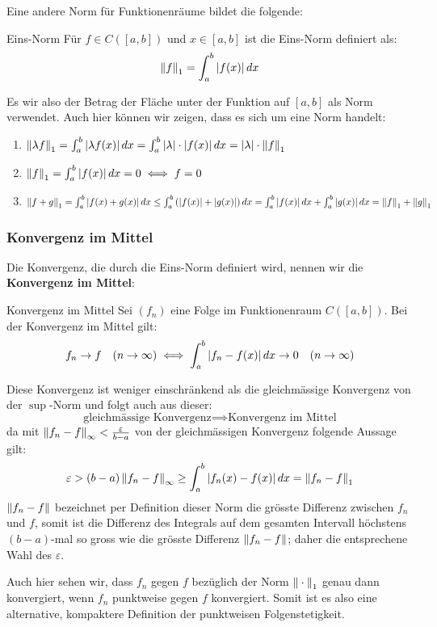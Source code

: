 Eine andere Norm für Funktionenräume bildet die folgende:
\begin{definition}{Eins-Norm}{}
Für $f \in C([a,b])$ und $x \in [a,b]$ ist die Eins-Norm definiert als:
$$\left\|f\right\|_1 = \int_a^b \left|f(x)\right| dx$$
\end{definition}
Es wir also der Betrag der Fläche unter der Funktion auf $[a, b]$ als Norm verwendet. Auch hier können wir zeigen, dass es sich um eine Norm handelt:

\begin{enumerate}[label=N\arabic*)]
    \item $\left\|\lambda f\right\|_1 = \int_a^b \left|\lambda f(x)\right|dx = \int_a^b \left|\lambda\right| \cdot \left|f(x)\right|dx = \left|\lambda\right| \cdot \left\|f\right\|_1$ 
    \item $\left\|f\right\|_1 = \int_a^b \left|f(x)\right|dx = 0 \iff f=0$
    \item $\left\|f + g\right\|_1 = \int_a^b \left|f(x) + g(x)\right|dx \leq \int_a^b \left(\left|f(x)\right| + \left|g(x)\right|\right) dx = \int_a^b\left|f(x)\right|dx + \int_a^b \left|g(x)\right|dx = \left\|f\right\|_1 + \left\|g\right\|_1$
\end{enumerate}

\subsubsection{Konvergenz im Mittel}
Die Konvergenz, die durch die Eins-Norm definiert wird, nennen wir die \textbf{Konvergenz im Mittel}:
\begin{definition}{Konvergenz im Mittel}{}
Sei $(f_n)$ eine Folge im Funktionenraum $C([a,b])$. Bei der Konvergenz im Mittel gilt:
$$f_n \to f  \quad (n \to \infty)\iff \int_a^b\left|f_n - f(x)\right| dx \to 0 \quad (n \to \infty)$$
\end{definition}
Diese Konvergenz ist weniger einschränkend als die gleichmässige Konvergenz von der $\sup$-Norm und folgt auch aus dieser:
$$\text{gleichmässige Konvergenz} \implies \text{Konvergenz im Mittel}$$
da mit $\left\|f_n - f\right\|_\infty < \frac{ \varepsilon}{b-a}$ von der gleichmässigen Konvergenz folgende Aussage gilt:
$$\varepsilon > (b-a) \left\|f_n - f\right\|_\infty \geq \int_a^b \left|f_n(x) -f(x)\right|dx = \left\|f_n-f\right\|_1$$
$\left\|f_n - f\right\|$ bezeichnet per Definition dieser Norm die grösste Differenz zwischen $f_n$ und $f$, somit ist die Differenz des Integrals auf dem gesamten Intervall höchstens $(b-a)$-mal so gross wie die grösste Differenz $\left\|f_n - f\right\|$; daher die entsprechene Wahl des $\varepsilon$.

Auch hier sehen wir, dass $f_n$ gegen $f$ bezüglich der Norm $\left\|\:\cdot\:\right\|_1$ genau dann konvergiert, wenn $f_n$ punktweise gegen $f$ konvergiert. Somit ist es also eine alternative, kompaktere Definition der punktweisen Folgenstetigkeit.

